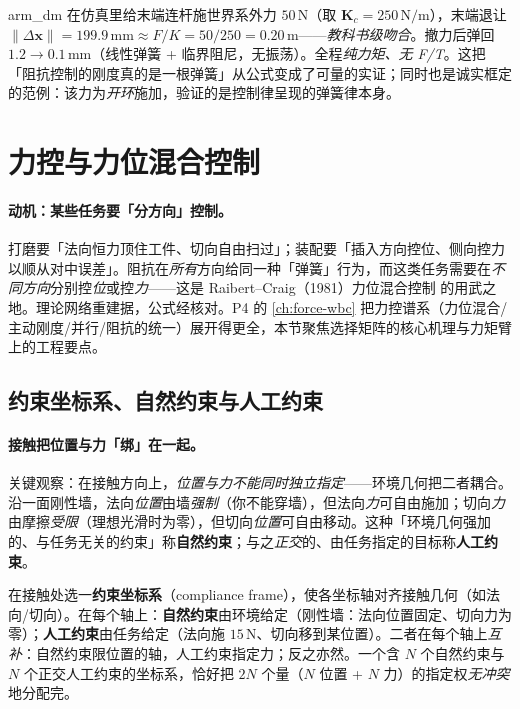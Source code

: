 \begin{note}[实测：$50\,\mathrm{N}\to0.2\,\mathrm{m}=F/K$ 精确吻合]
arm\_dm 在仿真里给末端连杆施世界系外力 $50\,\mathrm{N}$（取 $\mathbf{K}_c=250\,\mathrm{N/m}$），末端退让 $\|\Delta\mathbf{x}\|=199.9\,\mathrm{mm}\approx F/K=50/250=0.20\,\mathrm{m}$——\emph{教科书级吻合}。撤力后弹回 $1.2\to0.1\,\mathrm{mm}$（线性弹簧 + 临界阻尼，无振荡）。全程\emph{纯力矩、无 F/T}。这把「阻抗控制的刚度真的是一根弹簧」从公式变成了可量的实证；同时也是诚实框定的范例：该力为\emph{开环}施加，验证的是控制律呈现的弹簧律本身。
\end{note}

\section{力控与力位混合控制}
\label{sec:actrl-hybrid}

\paragraph{动机：某些任务要「分方向」控制。}
打磨要「法向恒力顶住工件、切向自由扫过」；装配要「插入方向控位、侧向控力以顺从对中误差」。阻抗在\emph{所有}方向给同一种「弹簧」行为，而这类任务需要在\emph{不同方向}分别控\emph{位}或控\emph{力}——这是 Raibert--Craig（1981）力位混合控制\cite{raibert1981hybrid} 的用武之地。理论网络重建据\cite{raibert1981hybrid}，公式经核对\rebuilt{}。P4 的 \cref{ch:force-wbc} 把力控谱系（力位混合/主动刚度/并行/阻抗的统一）展开得更全，本节聚焦选择矩阵的核心机理与力矩臂上的工程要点。

\subsection{约束坐标系、自然约束与人工约束}
\label{sec:actrl-constraints}

\paragraph{接触把位置与力「绑」在一起。}
关键观察：在接触方向上，\emph{位置与力不能同时独立指定}——环境几何把二者耦合。沿一面刚性墙，法向\emph{位置}由墙\emph{强制}（你不能穿墙），但法向\emph{力}可自由施加；切向\emph{力}由摩擦\emph{受限}（理想光滑时为零），但切向\emph{位置}可自由移动。这种「环境几何强加的、与任务无关的约束」称\textbf{自然约束}；与之\emph{正交}的、由任务指定的目标称\textbf{人工约束}。

\begin{definition}
\label{def:actrl-constraint-frame}
在接触处选一\textbf{约束坐标系}（compliance frame），使各坐标轴对齐接触几何（如法向/切向）。在每个轴上：\textbf{自然约束}由环境给定（刚性墙：法向位置固定、切向力为零）；\textbf{人工约束}由任务给定（法向施 $15\,\mathrm{N}$、切向移到某位置）。二者在每个轴上\emph{互补}：自然约束限位置的轴，人工约束指定力；反之亦然。一个含 $N$ 个自然约束与 $N$ 个正交人工约束的坐标系，恰好把 $2N$ 个量（$N$ 位置 + $N$ 力）的指定权\emph{无冲突}地分配完。
\end{definition}

